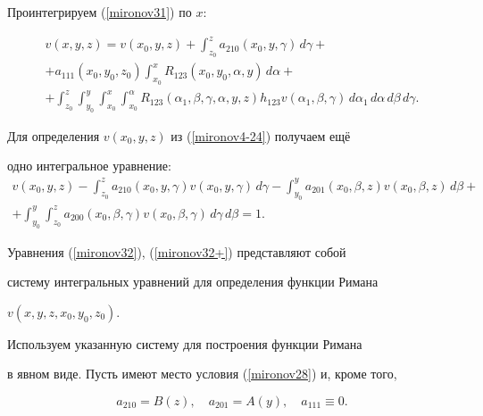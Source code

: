 Проинтегрируем (\ref{mironov31}) по $x$:


\begin{multline}\label{mironov32}


v(x, y, z)=v(x_0,y,z) +\int_{z_{0}}^{z} a_{210}(x_{0}, y,\gamma)\,d\gamma +\\


+a_{111}(x_{0}, y_{0}, z_{0})\int_{x_{0}}^{x} R_{123}(x_{0}, y_{0}, \alpha,y)\,d\alpha+\\


+\int_{z_{0}}^{z}\int_{y_{0}}^{y}\int_{x_{0}}^{x}\int_{x_{0}}^{\alpha}


R_{123}(\alpha_{1},\beta,\gamma,\alpha,y,z)


h_{123}v(\alpha_{1},\beta,\gamma)\, d\alpha_{1} \,d\alpha \,d\beta \,d\gamma.


\end{multline}


Для определения $v(x_0,y,z)$ из (\ref{mironov4-24}) получаем ещё


одно интегральное уравнение: \begin{multline}\label{mironov32+}


v(x_0,y,z)-\int_{z_0}^{z} a_{210}(x_0,y,\gamma)v(x_0,y,\gamma)


\,d\gamma -\int_{y_0}^{y} a_{201}(x_0,\beta,z)v(x_0,\beta,z) \,d\beta+\\


+\int_{y_0}^{y} \int_{z_0}^{z} a_{200}(x_0,\beta,\gamma)


v(x_0,\beta,\gamma) \,d\gamma \,d\beta=1.


\end{multline}


Уравнения (\ref{mironov32}), (\ref{mironov32+}) представляют собой


систему интегральных уравнений для определения функции Римана


$v(x, y, z,x_0,y_0,z_0)$.





Используем указанную систему для построения функции Римана


в явном виде. Пусть имеют место условия (\ref{mironov28}) и, кроме того,


\begin{equation}\label{mironov33}


a_{210}=B(z),\quad a_{201}=A(y),\quad a_{111}\equiv 0.


\end{equation}


